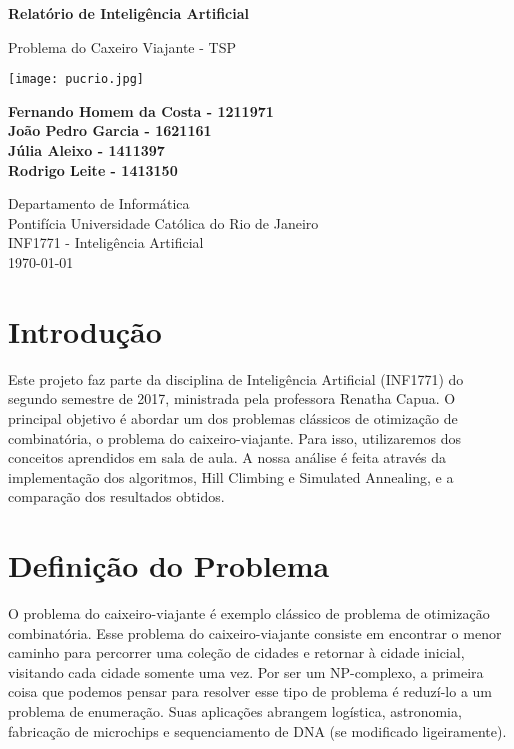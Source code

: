 \documentclass[a4paper,12 pts]{article}
\begin{document}
\begin{titlepage}
	\begin{center}
		\vspace*{1 cm}

		\Huge
		\textbf{Relatório de Inteligência Artificial}

		\vspace{0.5cm}
		\Large
		Problema do Caxeiro Viajante - TSP

		\vspace{1.5 cm}

		\texttt{[image: pucrio.jpg]} 

		\vspace{1.5 cm}

		\normalsize
		\textbf{Fernando Homem da Costa - 1211971}\\
		\textbf{João Pedro Garcia - 1621161}\\
		\textbf{Júlia Aleixo - 1411397}\\
		\textbf{Rodrigo Leite - 1413150}

		\vfill

		\Large
		Departamento de Informática\\
		Pontifícia Universidade Católica do Rio de Janeiro\\
		INF1771 - Inteligência Artificial\\
		\today

	\end{center}
\end{titlepage}

\tableofcontents

\newpage

\section{Introdução}

Este projeto faz parte da disciplina de Inteligência Artificial (INF1771) do segundo semestre de  2017, ministrada pela professora Renatha Capua. O principal objetivo é abordar um dos problemas clássicos de otimização de combinatória, o problema do caixeiro-viajante. Para isso, utilizaremos dos conceitos aprendidos em sala de aula. A nossa análise é feita através da implementação dos algoritmos, Hill Climbing e Simulated Annealing, e a comparação dos resultados obtidos.

\section{Definição do Problema}
	O problema do caixeiro-viajante é exemplo clássico de problema de otimização combinatória. Esse problema do caixeiro-viajante consiste em encontrar o menor caminho para percorrer uma coleção de cidades e retornar à cidade inicial, visitando cada cidade somente uma vez. Por ser um NP-complexo, a primeira coisa que podemos pensar para resolver esse tipo de problema é reduzí-lo a um problema de enumeração. Suas aplicações abrangem logística, astronomia, fabricação de microchips e sequenciamento de DNA (se modificado ligeiramente).
	
\end{document}

